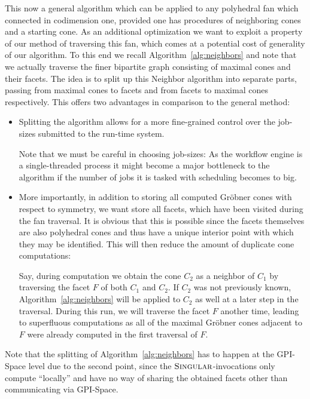 \documentclass[
  paper=a4,
  titlepage,
  bibliography=totoc,
  pagesize=pdftex
]{scrartcl}
\numberwithin{figure}{section}
\numberwithin{equation}{section}
\numberwithin{table}{section}
\theoremstyle{definition}
\numberwithin{definition}{section}
\begin{document}
This now a general algorithm which can be applied to any polyhedral fan which connected in
codimension one, provided one has procedures of neighboring cones and a starting cone. As
an additional optimization we want to exploit a property of our method of traversing this
fan, which comes at a potential cost of generality of our algorithm. To this end we recall
Algorithm~\ref{alg:neighbors} and note that we actually traverse the finer bipartite graph
consisting of maximal cones and their facets. The idea is to split up this Neighbor
algorithm into separate parts, passing from maximal cones to facets and from facets to
maximal cones respectively. This offers two advantages in comparison to the general
method:
\begin{itemize}
  \item Splitting the algorithm allows for a more fine-grained control over the job-sizes
    submitted to the run-time system.

    Note that we must be careful in choosing job-sizes: As the workflow engine is a
    single-threaded process it might become a major bottleneck to the algorithm if the
    number of jobs it is tasked with scheduling becomes to big.
  \item More importantly, in addition to storing all computed Gröbner cones with respect
    to symmetry, we want store all facets, which have been visited during the fan
    traversal. It is obvious that this is possible since the facets themselves are also
    polyhedral cones and thus have a unique interior point with which they may be
    identified. This will then reduce the amount of duplicate cone computations:

    Say, during computation we obtain the cone $C_2$ as a neighbor of $C_1$ by traversing
    the facet $F$ of both $C_1$ and $C_2$. If $C_2$ was not previously known,
    Algorithm~\ref{alg:neighbors} will be applied to $C_2$ as well at a later step in the
    traversal. During this run, we will traverse the facet $F$ another time, leading to
    superfluous computations as all of the maximal Gröbner cones adjacent to $F$ were
    already computed in the first traversal of $F$.
\end{itemize}
Note that the splitting of Algorithm~\ref{alg:neighbors} has to happen at the GPI-Space
level due to the second point, since the $\textsc{Singular}$-invocations only compute
\enquote{locally} and have no way of sharing the obtained facets other than communicating
via GPI-Space.
\end{document}
